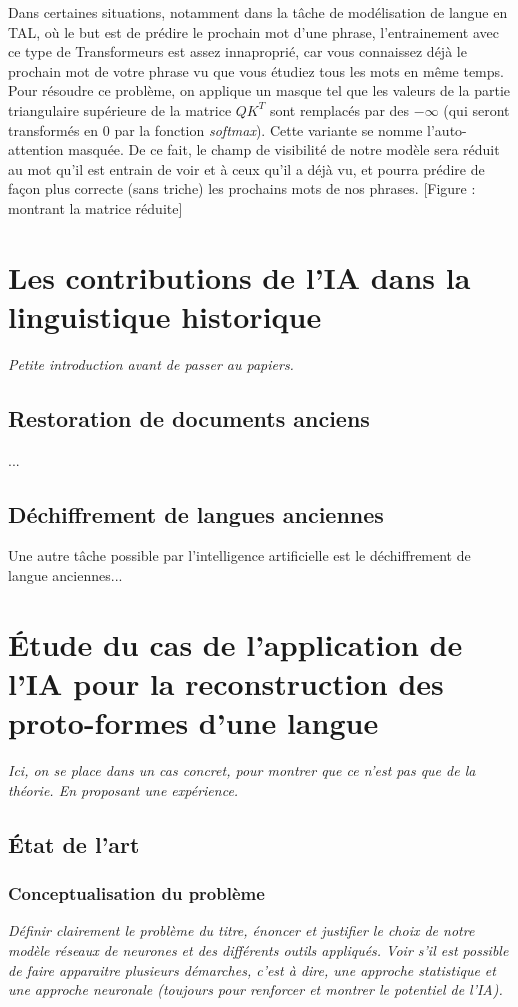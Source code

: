 \documentclass[12pt, french]{report}
\begin{document}
Dans certaines situations, notamment dans la tâche de modélisation de langue en TAL, où le but est de prédire le prochain mot d'une phrase, l'entrainement avec ce type de Transformeurs est assez innaproprié, car vous connaissez déjà le prochain mot de votre phrase vu que vous étudiez tous les mots en même temps. Pour résoudre ce problème, on applique un masque tel que les valeurs de la partie triangulaire supérieure de la matrice $QK^T$ sont remplacés par des $-\infty$ (qui seront transformés en 0 par la fonction \textit{softmax}). Cette variante se nomme l'auto-attention masquée. De ce fait, le champ de visibilité de notre modèle sera réduit au mot qu'il est entrain de voir et à ceux qu'il a déjà vu, et pourra prédire de façon plus correcte (sans triche) les prochains mots de nos phrases. [Figure : montrant la matrice réduite]

\chapter{Les contributions de l'IA dans la linguistique historique}
\textit{Petite introduction avant de passer au papiers.}

\section{Restoration de documents anciens}
...

\section{Déchiffrement de langues anciennes}
Une autre tâche possible par l'intelligence artificielle est le déchiffrement de langue anciennes...

\chapter{Étude du cas de l'application de l'IA pour la reconstruction des proto-formes d'une langue}
\textit{Ici, on se place dans un cas concret, pour montrer que ce n'est pas que de la théorie. En proposant une expérience.}
\section{État de l'art}
\subsection{Conceptualisation du problème}
\textit{Définir clairement le problème du titre, énoncer et justifier le choix de notre modèle réseaux de neurones et des différents outils appliqués. Voir s'il est possible de faire apparaitre plusieurs démarches, c'est à dire, une approche statistique et une approche neuronale (toujours pour renforcer et montrer le potentiel de l'IA).}
\end{document}
